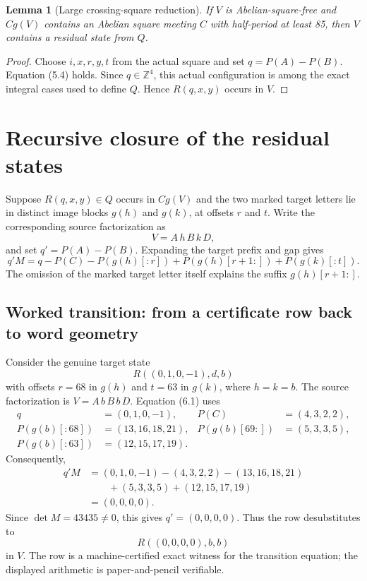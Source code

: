 \documentclass[11pt]{article}
\newtheorem{lemma}[theorem]{Lemma}
\theoremstyle{definition}
\newcommand{\Par}{P}
\begin{document}
\begin{lemma}[Large crossing-square reduction]
If $V$ is Abelian-square-free and $Cg(V)$ contains an Abelian square meeting $C$ with half-period at least 85, then $V$ contains a residual state from $Q$.
\end{lemma}

\begin{proof}
Choose $i,x,r,y,t$ from the actual square and set $q=\Par(A)-\Par(B)$. Equation (5.4) holds. Since $q\in\mathbb Z^4$, this actual configuration is among the exact integral cases used to define $Q$. Hence $R(q,x,y)$ occurs in $V$.
\end{proof}

\section{Recursive closure of the residual states}

Suppose $R(q,x,y)\in Q$ occurs in $Cg(V)$ and the two marked target letters lie in distinct image blocks $g(h)$ and $g(k)$, at offsets $r$ and $t$. Write the corresponding source factorization as
\[
V=A\,h\,B\,k\,D,
\]
and set $q'=\Par(A)-\Par(B)$. Expanding the target prefix and gap gives
\[
q'M=
q-\Par(C)-\Par(g(h)[:r])+\Par(g(h)[r+1:])+\Par(g(k)[:t]).
\tag{6.1}
\]
The omission of the marked target letter itself explains the suffix $g(h)[r+1:]$.

\subsection{Worked transition: from a certificate row back to word geometry}

Consider the genuine target state
\[
R((0,1,0,-1),d,b)
\]
with offsets $r=68$ in $g(h)$ and $t=63$ in $g(k)$, where $h=k=b$. The source factorization is $V=A\,b\,B\,b\,D$. Equation (6.1) uses
\[
\begin{aligned}
q&=(0,1,0,-1),&\Par(C)&=(4,3,2,2),\\
\Par(g(b)[:68])&=(13,16,18,21),&\Par(g(b)[69:])&=(5,3,3,5),\\
\Par(g(b)[:63])&=(12,15,17,19).
\end{aligned}
\]
Consequently,
\[
\begin{aligned}
q'M
&=(0,1,0,-1)-(4,3,2,2)-(13,16,18,21)\\
&\qquad +(5,3,3,5)+(12,15,17,19)\\
&=(0,0,0,0).
\end{aligned}
\]
Since $\det M=43435\ne0$, this gives $q'=(0,0,0,0)$. Thus the row desubstitutes to
\[
R((0,0,0,0),b,b)
\]
in $V$. The row is a machine-certified exact witness for the transition equation; the displayed arithmetic is paper-and-pencil verifiable.
\end{document}
